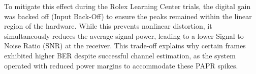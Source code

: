 To mitigate this effect during the Rolex Learning Center trials, the digital gain was backed off (Input Back-Off) to ensure the peaks remained within the linear region of the hardware. While this prevents nonlinear distortion, it simultaneously reduces the average signal power, leading to a lower Signal-to-Noise Ratio (SNR) at the receiver. This trade-off explains why certain frames exhibited higher BER despite successful channel estimation, as the system operated with reduced power margins to accommodate these PAPR spikes.